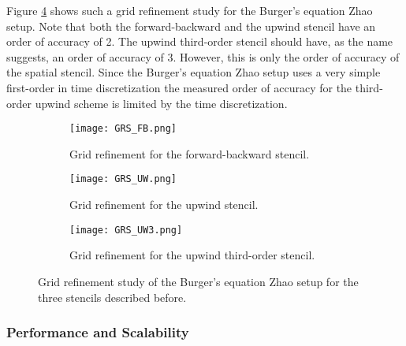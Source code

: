 Figure \ref{fig:grs} shows such a grid refinement study for the Burger's equation Zhao setup.
Note that both the forward-backward and the upwind stencil have an order of accuracy of 2.
The upwind third-order stencil should have, as the name suggests, an order of accuracy of 3.
However, this is only the order of accuracy of the spatial stencil.
Since the Burger's equation Zhao setup uses a very simple first-order in time discretization the measured order of accuracy for the third-order upwind scheme is limited by the time discretization.

\begin{figure}[!htbp]
\centering
\begin{subfigure}{0.8\textwidth}
  \centering
  \texttt{[image: GRS\_FB.png]}
  \caption{Grid refinement for the forward-backward stencil.}
  \label{fig:grs_1}
\end{subfigure}

\begin{subfigure}{0.8\textwidth}
  \centering
  \texttt{[image: GRS\_UW.png]}
  \caption{Grid refinement for the upwind stencil.}
  \label{fig:grs_2}
\end{subfigure}

\begin{subfigure}{0.8\textwidth}
  \centering
  \texttt{[image: GRS\_UW3.png]}
  \caption{Grid refinement for the upwind third-order stencil.}
  \label{fig:grs_3}
\end{subfigure}
\caption{Grid refinement study of the Burger's equation Zhao setup for the three stencils described before.}
\label{fig:grs}
\end{figure}

\subsubsection{Performance and Scalability}

